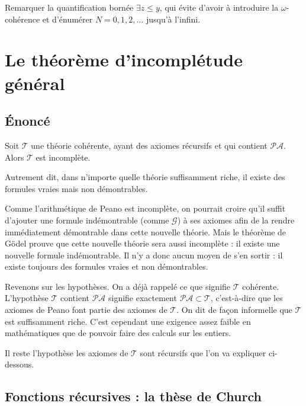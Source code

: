 \documentclass[11pt,class=report,crop=false]{standalone}
\begin{document}
Remarquer la quantification bornée \og{}$\exists z \le y$\fg{}, qui évite d'avoir à introduire la $\omega$-cohérence et d'énumérer $N=0,1,2,\dots$ jusqu'à l'infini.


\section{Le théorème d'incomplétude général}

\subsection{Énoncé}

\begin{theoreme}
Soit $\mathcal{T}$ une théorie cohérente, ayant des axiomes récursifs et qui contient $\mathcal{PA}$. Alors $\mathcal{T}$ est incomplète.
\end{theoreme}

Autrement dit, dans n'importe quelle théorie suffisamment riche, il existe des formules vraies mais non démontrables.

Comme l'arithmétique de Peano est incomplète, on pourrait croire qu'il suffit d'ajouter 
une formule indémontrable (comme $\mathcal{G}$) à ses axiomes afin de la rendre immédiatement démontrable dans cette nouvelle théorie. Mais le théorème de Gödel prouve que cette nouvelle théorie sera aussi incomplète : il existe une nouvelle formule indémontrable. Il n'y a donc aucun moyen de s'en sortir : il existe toujours des formules vraies et non démontrables.

Revenons sur les hypothèses. On a déjà rappelé ce que signifie \og{}$\mathcal{T}$ cohérente\fg{}. L'hypothèse \og{}$\mathcal{T}$ contient $\mathcal{PA}$\fg{} signifie exactement \og{}$\mathcal{PA} \subset \mathcal{T}$\fg{}, c'est-à-dire que les axiomes de Peano font partie des axiomes de $\mathcal{T}$. On dit de façon informelle que $\mathcal{T}$ est \og{}suffisamment riche\fg{}. 
C'est cependant une exigence assez faible en mathématiques que de pouvoir faire des calculs sur les entiers.

Il reste l'hypothèse \og{}les axiomes de $\mathcal{T}$ sont récursifs\fg{} que l'on va expliquer ci-dessous.

\subsection{Fonctions récursives : la thèse de Church}
\end{document}
